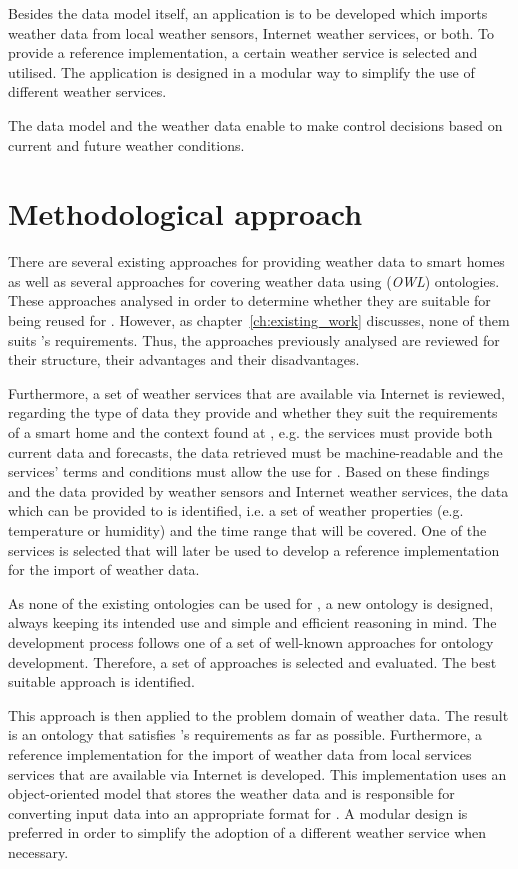 Besides the data model itself, an application is to be developed which imports weather data from local weather sensors, Internet weather services, or both. To provide a reference implementation, a certain weather service is selected and utilised. The application is designed in a modular way to simplify the use of different weather services.

The data model and the weather data enable \thinkhome to make control decisions based on current and future weather conditions.

\section{Methodological approach}

There are several existing approaches for providing weather data to smart homes as well as several approaches for covering weather data using (\emph{OWL}) ontologies. These approaches analysed in order to determine whether they are suitable for being reused for \thinkhome. However, as chapter~\ref{ch:existing_work} discusses, none of them suits \thinkhome's requirements. Thus, the approaches previously analysed are reviewed for their structure, their advantages and their disadvantages.

Furthermore, a set of weather services that are available via Internet is reviewed, regarding the type of data they provide and whether they suit the requirements of a smart home and the context found at \thinkhome, e.g. the services must provide both current data and forecasts, the data retrieved must be machine-readable and the services' terms and conditions must allow the use for \thinkhome. Based on these findings and the data provided by weather sensors and Internet weather services, the data which can be provided to \thinkhome is identified, i.e. a set of weather properties (e.g. temperature or humidity) and the time range that will be covered. One of the services is selected that will later be used to develop a reference implementation for the import of weather data.

As none of the existing ontologies can be used for \thinkhome, a new  ontology is designed, always keeping its intended use and simple and efficient reasoning in mind. The development process follows one of a set of well-known approaches for ontology development. Therefore, a set of approaches is selected and evaluated. The best suitable approach is identified.

This approach is then applied to the problem domain of weather data. The result is an ontology that satisfies \thinkhome's requirements as far as possible. Furthermore, a reference implementation for the import of weather data from local services services that are available via Internet is developed. This implementation uses an object-oriented model that stores the weather data and is responsible for converting input data into an appropriate format for \thinkhome. A modular design is preferred in order to simplify the adoption of a different weather service when necessary.

